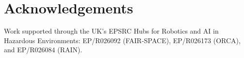 
  
\section*{Acknowledgements}   

Work supported through the UK's EPSRC Hubs for Robotics and AI in Hazardous Environments: EP/R026092 (FAIR-SPACE), EP/R026173 (ORCA), and EP/R026084 (RAIN).

